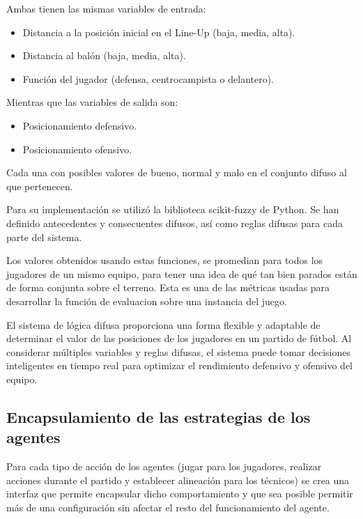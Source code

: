 \documentclass{article}
\begin{document}
Ambas tienen las mismas variables de entrada:
\begin{itemize}
      \item Distancia a la posición inicial en el Line-Up (baja, media, alta).
            
      \item Distancia al balón (baja, media, alta).
            
      \item Función del jugador (defensa, centrocampista o delantero).
\end{itemize}

Mientras que las variables de salida son:
\begin{itemize}
      \item Posicionamiento defensivo.
            
      \item Posicionamiento ofensivo.
\end{itemize}


Cada una con posibles valores de bueno, normal y malo en el conjunto difuso al que pertenecen.

Para su implementación se utilizó la biblioteca scikit-fuzzy de Python. Se han definido antecedentes y consecuentes difusos, 
así como reglas difusas para cada parte del sistema. 

Los valores obtenidos usando estas funciones, se promedian para todos los jugadores de un mismo equipo, para tener una idea de 
qué tan bien parados están de forma conjunta sobre el terreno. Esta es una de las métricas usadas para desarrollar la función de 
evaluacion sobre una instancia del juego.

El sistema de lógica difusa proporciona una forma flexible y adaptable de determinar el valor de las posiciones de los jugadores 
en un partido de fútbol. Al considerar múltiples variables y reglas difusas, el sistema puede tomar decisiones inteligentes en 
tiempo real para optimizar el rendimiento defensivo y ofensivo del equipo.

\subsection{Encapsulamiento de las estrategias de los agentes}

Para cada tipo de acción de los agentes (jugar para los jugadores, realizar acciones durante el partido y establecer alineación para los
técnicos) se crea una interfaz que permite encapsular dicho comportamiento y que sea posible permitir más de una configuración sin afectar
el resto del funcionamiento del agente.
\end{document}
